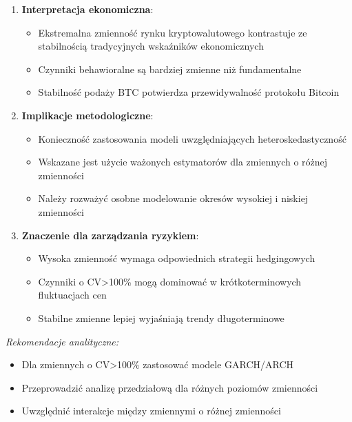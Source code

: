 \documentclass[
  11pt,
]{article}
\providecommand{\tightlist}{%
  \setlength{\itemsep}{0pt}\setlength{\parskip}{0pt}}
\begin{document}
\begin{enumerate}
\def\labelenumi{\arabic{enumi}.}
\tightlist
\item
  \textbf{Interpretacja ekonomiczna}: \vspace{0.2cm}

  \begin{itemize}
  \tightlist
  \item
    Ekstremalna zmienność rynku kryptowalutowego kontrastuje ze
    stabilnością tradycyjnych wskaźników ekonomicznych
  \item
    Czynniki behawioralne są bardziej zmienne niż fundamentalne
  \item
    Stabilność podaży BTC potwierdza przewidywalność protokołu Bitcoin
  \end{itemize}
\item
  \textbf{Implikacje metodologiczne}: \vspace{0.2cm}

  \begin{itemize}
  \tightlist
  \item
    Konieczność zastosowania modeli uwzględniających
    heteroskedastyczność
  \item
    Wskazane jest użycie ważonych estymatorów dla zmiennych o różnej
    zmienności
  \item
    Należy rozważyć osobne modelowanie okresów wysokiej i niskiej
    zmienności
  \end{itemize}
\item
  \textbf{Znaczenie dla zarządzania ryzykiem}: \vspace{0.2cm}

  \begin{itemize}
  \tightlist
  \item
    Wysoka zmienność wymaga odpowiednich strategii hedgingowych
  \item
    Czynniki o CV\textgreater100\% mogą dominować w krótkoterminowych
    fluktuacjach cen
  \item
    Stabilne zmienne lepiej wyjaśniają trendy długoterminowe
  \end{itemize}
\end{enumerate}

\vspace{0.3cm}

\textit{Rekomendacje analityczne:}

\begin{itemize}
\item Dla zmiennych o CV>100\% zastosować modele GARCH/ARCH
\item Przeprowadzić analizę przedziałową dla różnych poziomów zmienności
\item Uwzględnić interakcje między zmiennymi o różnej zmienności
\end{itemize}
\end{document}

